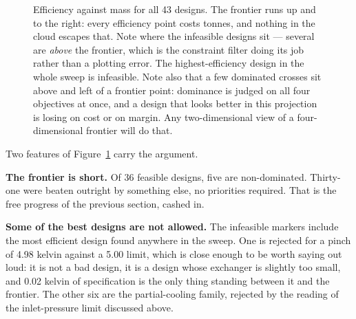 \documentclass[11pt,a4paper]{report}
\begin{document}
\begin{figure}[htbp]
\centering
{}
\caption{Efficiency against mass for all \num{43} designs. The frontier runs
up and to the right: every efficiency point costs tonnes, and nothing in the
cloud escapes that. Note where the infeasible designs sit --- several are
\emph{above} the frontier, which is the constraint filter doing its job
rather than a plotting error. The highest-efficiency design in the whole
sweep is infeasible. Note also that a few dominated crosses sit above and
left of a frontier point: dominance is judged on all four objectives at
once, and a design that looks better in this projection is losing on cost or
on margin. Any two-dimensional view of a four-dimensional frontier will do
that.}
\label{fig:pareto_mass}
\end{figure}

Two features of Figure~\ref{fig:pareto_mass} carry the argument.

\textbf{The frontier is short.} Of \num{36} feasible designs, five are
non-dominated. Thirty-one were beaten outright by something else, no
priorities required. That is the free progress of the previous section,
cashed in.

\textbf{Some of the best designs are not allowed.} The infeasible markers
include the most efficient design found anywhere in the sweep. One is
rejected for a pinch of \num{4.98} kelvin against a \num{5.00} limit, which
is close enough to be worth saying out loud: it is not a bad design, it is a
design whose exchanger is slightly too small, and \num{0.02} kelvin of
specification is the only thing standing between it and the frontier. The
other six are the partial-cooling family, rejected by the reading of the
inlet-pressure limit discussed above.
\end{document}
